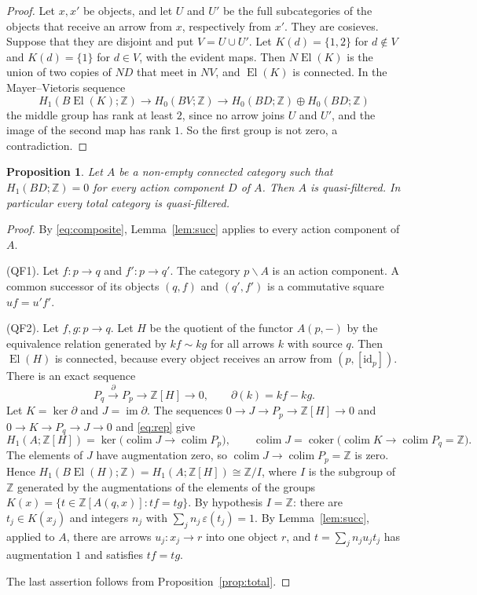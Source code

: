 \documentclass[11pt,a4paper]{article}
\newtheorem{proposition}[theorem]{Proposition}
\theoremstyle{definition}
\newcommand{\El}{\operatorname{El}}
\newcommand{\colim}{\operatorname{colim}}
\newcommand{\id}{\mathrm{id}}
\newcommand{\Z}{\mathbb{Z}}
\begin{document}
\begin{proof}
Let $x,x'$ be objects, and let $U$ and $U'$ be the full subcategories of the
objects that receive an arrow from $x$, respectively from $x'$. They are
cosieves. Suppose that they are disjoint and put $V=U\cup U'$. Let
$K(d)=\{1,2\}$ for $d\notin V$ and $K(d)=\{1\}$ for $d\in V$, with the
evident maps. Then $N\El(K)$ is the union of two copies of $ND$ that meet in
$NV$, and $\El(K)$ is connected. In the Mayer--Vietoris sequence
\[
 H_1(B\El(K);\Z)\longrightarrow H_0(BV;\Z)\longrightarrow
 H_0(BD;\Z)\oplus H_0(BD;\Z)
\]
the middle group has rank at least $2$, since no arrow joins $U$ and $U'$,
and the image of the second map has rank $1$. So the first group is not
zero, a contradiction.
\end{proof}

\begin{proposition}\label{prop:qf}
Let $A$ be a non-empty connected category such that $H_1(BD;\Z)=0$ for every
action component $D$ of $A$. Then $A$ is quasi-filtered. In particular every
total category is quasi-filtered.
\end{proposition}

\begin{proof}
By \eqref{eq:composite}, Lemma~\ref{lem:succ} applies to every action
component of $A$.

(QF1). Let $f\colon p\to q$ and $f'\colon p\to q'$. The category
$p\backslash A$ is an action component. A common successor of its objects
$(q,f)$ and $(q',f')$ is a commutative square $uf=u'f'$.

(QF2). Let $f,g\colon p\to q$. Let $H$ be the quotient of the functor
$A(p,-)$ by the equivalence relation generated by $kf\sim kg$ for all arrows
$k$ with source $q$. Then $\El(H)$ is connected, because every object
receives an arrow from $(p,[\id_p])$. There is an exact sequence
\[
 P_q\xrightarrow{\ \partial\ }P_p\longrightarrow\Z[H]\longrightarrow 0,
 \qquad\partial(k)=kf-kg .
\]
Let $K=\ker\partial$ and $J=\operatorname{im}\partial$. The sequences
$0\to J\to P_p\to\Z[H]\to0$ and $0\to K\to P_q\to J\to 0$ and \eqref{eq:rep}
give
\[
 H_1(A;\Z[H])=\ker\bigl(\colim J\to\colim P_p\bigr),\qquad
 \colim J=\operatorname{coker}\bigl(\colim K\to\colim P_q=\Z\bigr).
\]
The elements of $J$ have augmentation zero, so $\colim J\to\colim P_p=\Z$ is
zero. Hence $H_1(B\El(H);\Z)=H_1(A;\Z[H])\cong\Z/I$, where $I$ is the subgroup
of $\Z$ generated by the augmentations of the elements of the groups
$K(x)=\{t\in\Z[A(q,x)]:tf=tg\}$. By hypothesis $I=\Z$: there are
$t_j\in K(x_j)$ and integers $n_j$ with $\sum_jn_j\,\varepsilon(t_j)=1$. By
Lemma~\ref{lem:succ}, applied to $A$, there are arrows $u_j\colon x_j\to r$
into one object $r$, and $t=\sum_jn_ju_jt_j$ has augmentation $1$ and
satisfies $tf=tg$.

The last assertion follows from Proposition~\ref{prop:total}.
\end{proof}
\end{document}
